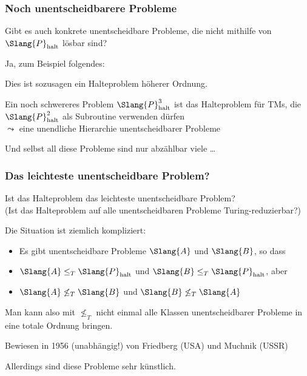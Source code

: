 \documentclass[aspectratio=1610,onlymath]{beamer}
\begin{document}
\begin{frame}\frametitle{Noch unentscheidbarere Probleme}

Gibt es auch konkrete unentscheidbare Probleme, die nicht
mithilfe von $\Slang{P}_{\text{halt}}$ lösbar sind?
\bigskip\pause

Ja, zum Beispiel folgendes:


Dies ist sozusagen ein Halteproblem höherer Ordnung.\bigskip\pause

Ein noch schwereres Problem $\Slang{P}^3_{\text{halt}}$ ist
das Halteproblem für TMs, die $\Slang{P}^2_{\text{halt}}$ als Subroutine
verwenden dürfen\\
$\leadsto$ \alert{eine unendliche Hierarchie unentscheidbarer Probleme}
\bigskip\pause

Und selbst all diese Probleme sind nur abzählbar viele \ldots

\end{frame}

\begin{frame}\frametitle{Das leichteste unentscheidbare Problem?}

\begin{center}
\alert{Ist das Halteproblem das leichteste unentscheidbare Problem?}\\
{\tiny (Ist das Halteproblem auf alle unentscheidbaren Probleme Turing-reduzierbar?)}
\end{center}

\bigskip
\pause {}
\bigskip

Die Situation ist ziemlich kompliziert:
\begin{itemize}
\item Es gibt unentscheidbare Probleme $\Slang{A}$ und $\Slang{B}$, so dass
\item $\Slang{A}\leq_T \Slang{P}_{\text{halt}}$ und $\Slang{B}\leq_T \Slang{P}_{\text{halt}}$, aber
\item $\Slang{A}\not\leq_T \Slang{B}$ und $\Slang{B}\not\leq_T \Slang{A}$
\end{itemize}

Man kann also mit $\not\leq_T$ nicht einmal alle Klassen unentscheidbarer Probleme
in eine totale Ordnung bringen.

{\tiny Bewiesen in 1956 (unabhängig!) von Friedberg (USA) und Muchnik (USSR)}
\bigskip

Allerdings sind diese Probleme sehr künstlich.

\end{frame}
\end{document}
